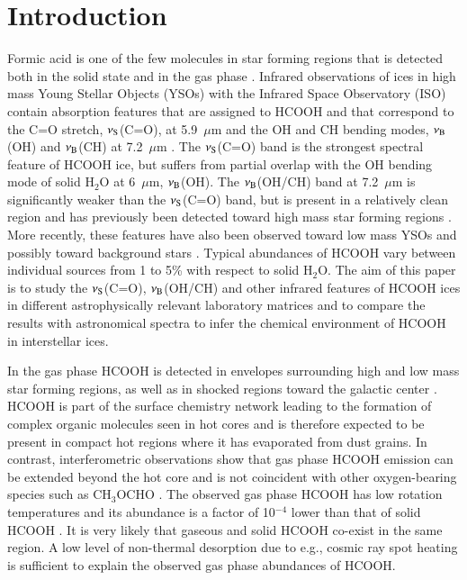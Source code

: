 \documentclass{aa}
\begin{document}

   \maketitle
%

\section{Introduction}

Formic acid is one of the few molecules in star forming regions that
is detected both in the solid state and in the gas phase \citep[see
e.g.,][]{schutte1999,ikeda2001}. Infrared observations of ices in high
mass Young Stellar Objects (YSOs) with the Infrared Space Observatory
(ISO) contain absorption features that are assigned to HCOOH and that
correspond to the C=O stretch, $\nu_{\rm S}$(C=O), at 5.9~$\mu$m and
the OH and CH bending modes, $\nu_{\rm B}$(OH) and $\nu_{\rm B}$(CH)
at 7.2~$\mu$m \citep{schutte1997,schutte1999}. The $\nu_{\rm S}$(C=O)
band is the strongest spectral feature of HCOOH ice, but suffers from
partial overlap with the OH bending mode of solid H$_2$O at 6~$\mu$m,
$\nu_{\rm B}$(OH). The $\nu_{\rm B}$(OH/CH) band at 7.2~$\mu$m is
significantly weaker than the $\nu_{\rm S}$(C=O) band, but is present
in a relatively clean region and has previously been detected toward
high mass star forming regions \citep{schutte1999}. More recently,
these features have also been observed toward low mass YSOs and
possibly toward background stars \citep[Boogert et al. in
prep.;][]{knez2005}. Typical abundances of HCOOH vary between
individual sources from 1 to 5\% with respect to solid H$_2$O. The aim
of this paper is to study the $\nu_{\rm S}$(C=O), $\nu_{\rm B}$(OH/CH)
and other infrared features of HCOOH ices in different astrophysically
relevant laboratory matrices and to compare the results with
astronomical spectra to infer the chemical environment of HCOOH in
interstellar ices.

In the gas phase HCOOH is detected in envelopes surrounding high and
low mass star forming regions, as well as in shocked regions toward
the galactic center
\citep{dishoeck1995,ikeda2001,bottinelli2007,requena2006,bisschop2007a}. HCOOH
is part of the surface chemistry network leading to the formation of
complex organic molecules seen in hot cores \citep{tielens1997} and is
therefore expected to be present in compact hot regions where it has
evaporated from dust grains. In contrast, interferometric observations
show that gas phase HCOOH emission can be extended beyond the hot core
and is not coincident with other oxygen-bearing species such as
CH$_3$OCHO \citep{liu2002,hollis2003,remijan2006}. The observed gas
phase HCOOH has low rotation temperatures and its abundance is a
factor of 10$^{-4}$ lower than that of solid HCOOH
\citep{bisschop2007a}. It is very likely that gaseous and solid HCOOH
co-exist in the same region. A low level of non-thermal desorption due
to e.g., cosmic ray spot heating is sufficient to explain the observed
gas phase abundances of HCOOH.
\end{document}
